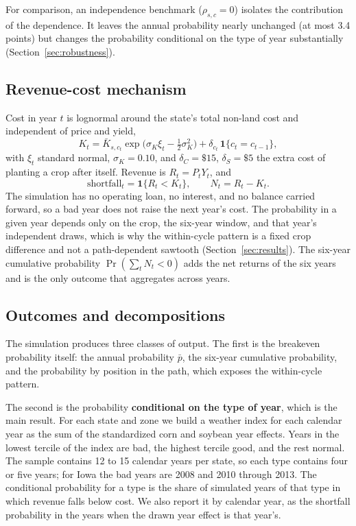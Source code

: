 \documentclass[11pt,letterpaper]{article}
\theoremstyle{remark}
\begin{document}
For comparison, an independence benchmark ($\rho_{s,c}=0$) isolates the contribution of the dependence. It leaves the annual probability nearly unchanged (at most 3.4 points) but changes the probability conditional on the type of year substantially (Section~\ref{sec:robustness}).

\subsection{\label{subsec:mechanism}Revenue-cost mechanism}

Cost in year $t$ is lognormal around the state's total non-land cost and independent of price and yield,
\begin{equation}
K_t = \bar K_{s,c_t}\exp\big(\sigma_K\xi_t - \tfrac12\sigma_K^2\big) + \delta_{c_t}\,\mathbf 1\{c_t = c_{t-1}\}, \label{eq:cost}
\end{equation}
with $\xi_t$ standard normal, $\sigma_K=0.10$, and $\delta_C=\$15$, $\delta_S=\$5$ the extra cost of planting a crop after itself. Revenue is $R_t = P_t Y_t$, and
\begin{equation}
\text{shortfall}_t = \mathbf 1\{R_t < K_t\}, \qquad N_t = R_t - K_t. \label{eq:net}
\end{equation}
The simulation has no operating loan, no interest, and no balance carried forward, so a bad year does not raise the next year's cost. The probability in a given year depends only on the crop, the six-year window, and that year's independent draws, which is why the within-cycle pattern is a fixed crop difference and not a path-dependent sawtooth (Section~\ref{sec:results}). The six-year cumulative probability $\Pr(\sum_t N_t<0)$ adds the net returns of the six years and is the only outcome that aggregates across years.

\subsection{\label{subsec:decompositions}Outcomes and decompositions}

The simulation produces three classes of output. The first is the breakeven probability itself: the annual probability $\bar p$, the six-year cumulative probability, and the probability by position in the path, which exposes the within-cycle pattern.

The second is the probability \textbf{conditional on the type of year}, which is the main result. For each state and zone we build a weather index for each calendar year as the sum of the standardized corn and soybean year effects. Years in the lowest tercile of the index are bad, the highest tercile good, and the rest normal. The sample contains 12 to 15 calendar years per state, so each type contains four or five years; for Iowa the bad years are 2008 and 2010 through 2013. The conditional probability for a type is the share of simulated years of that type in which revenue falls below cost. We also report it by calendar year, as the shortfall probability in the years when the drawn year effect is that year's.
\end{document}
